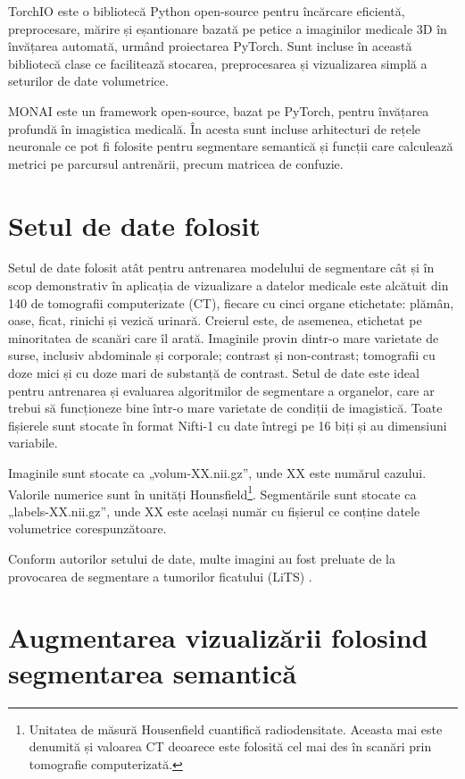 TorchIO este o bibliotecă Python open-source pentru încărcare eficientă, preprocesare, mărire și eșantionare bazată pe petice a imaginilor medicale 3D în învățarea automată, urmând proiectarea PyTorch. Sunt incluse în această bibliotecă clase ce facilitează stocarea, preprocesarea și vizualizarea simplă a seturilor de date volumetrice.

MONAI este un framework open-source, bazat pe PyTorch, pentru învățarea profundă în imagistica medicală. În acesta sunt incluse arhitecturi de rețele neuronale ce pot fi folosite pentru segmentare semantică și funcții care calculează metrici pe parcursul antrenării, precum matricea de confuzie.


\section{Setul de date folosit}

Setul de date folosit atât pentru antrenarea modelului de segmentare cât și în scop demonstrativ în aplicația de vizualizare a datelor medicale este alcătuit din 140 de tomografii computerizate (CT), fiecare cu cinci organe etichetate: plămân, oase, ficat, rinichi și vezică urinară. Creierul este, de asemenea, etichetat pe minoritatea de scanări care îl arată. Imaginile provin dintr-o mare varietate de surse, inclusiv abdominale și corporale; contrast și non-contrast; tomografii cu doze mici și cu doze mari de substanță de contrast. Setul de date este ideal pentru antrenarea și evaluarea algoritmilor de segmentare a organelor, care ar trebui să funcționeze bine într-o mare varietate de condiții de imagistică. Toate fișierele sunt stocate în format Nifti-1 cu date întregi pe 16 biți și au dimensiuni variabile.

Imaginile sunt stocate ca „volum-XX.nii.gz”, unde XX este numărul cazului. Valorile numerice sunt în unități Hounsfield\footnote{Unitatea de măsură Housenfield cuantifică radiodensitate. Aceasta mai este denumită și valoarea CT deoarece este folosită cel mai des în scanări prin tomografie computerizată.}. Segmentările sunt stocate ca „labels-XX.nii.gz”, unde XX este același număr cu fișierul ce conține datele volumetrice corespunzătoare.

Conform autorilor setului de date, multe imagini au fost preluate de la provocarea de segmentare a tumorilor ficatului (LiTS) \cite{DBLP:journals/corr/abs-1901-04056}.


\section{Augmentarea vizualizării folosind segmentarea semantică}


